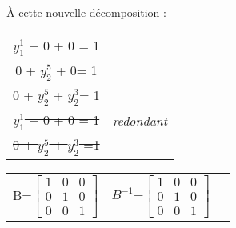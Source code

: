 À cette nouvelle décomposition :

\begin{tabular}{cc}
$y_1^1$  + 0 + 0 = 1 & \\
0 + $y_2^5$ + 0= 1 & \\
0 + $y_2^5$ + $y_2^3$= 1 & \\
\sout{$y_1^1$  + 0 + 0 = 1} & \textit{redondant}\\
\sout{0 + $y_2^5$ + $y_2^3$ =1} & \\ 
\end{tabular}

\begin{center}
\begin{tabular}{c c c}
B=$\begin{bmatrix}
1 & 0 & 0\\
0 & 1 & 0 \\
0 & 0 & 1 
 \end{bmatrix} $                  
&
$B^{-1}$=$\begin{bmatrix}
1 & 0 & 0\\
0 & 1 & 0 \\
0 & 0 & 1 
 \end{bmatrix} $             
\end{tabular}
\end{center}

